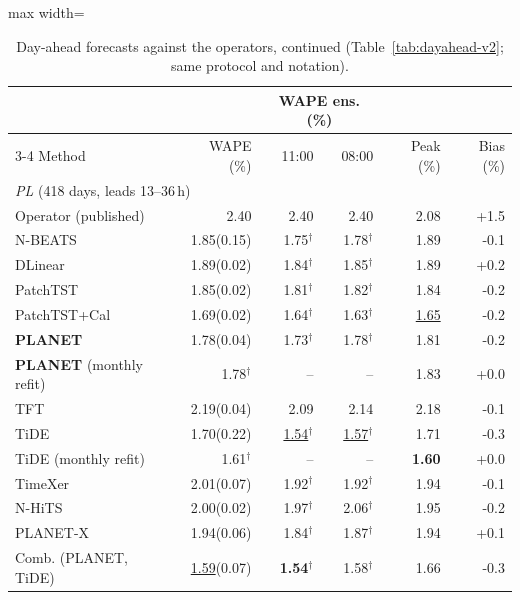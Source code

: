 \begin{table}[!t]
\centering
\caption{Day-ahead forecasts against the operators, continued (Table~\ref{tab:dayahead-v2}; same protocol and notation).}
\label{tab:dayahead-v2-c}
\setlength{\tabcolsep}{2.5pt}\footnotesize
\begin{adjustbox}{max width=\linewidth}
\begin{tabular}{lrrrrr}
\toprule
 & & \multicolumn{2}{c}{WAPE ens. (\%)} & & \\
\cmidrule(lr){3-4}
Method & WAPE (\%) & 11:00 & 08:00 & Peak (\%) & Bias (\%) \\
\midrule
\multicolumn{6}{l}{\textit{PL} (418 days, leads 13--36\,h)} \\
\quad Operator (published) & 2.40 & 2.40 & 2.40 & 2.08 & +1.5 \\
\quad N-BEATS & 1.85{\scriptsize\color{gray}(0.15)} & 1.75$^{\dagger}$ & 1.78$^{\dagger}$ & 1.89 & -0.1 \\
\quad DLinear & 1.89{\scriptsize\color{gray}(0.02)} & 1.84$^{\dagger}$ & 1.85$^{\dagger}$ & 1.89 & +0.2 \\
\quad PatchTST & 1.85{\scriptsize\color{gray}(0.02)} & 1.81$^{\dagger}$ & 1.82$^{\dagger}$ & 1.84 & -0.2 \\
\quad PatchTST+Cal & 1.69{\scriptsize\color{gray}(0.02)} & 1.64$^{\dagger}$ & 1.63$^{\dagger}$ & \underline{1.65} & -0.2 \\
\quad \textbf{PLANET} & 1.78{\scriptsize\color{gray}(0.04)} & 1.73$^{\dagger}$ & 1.78$^{\dagger}$ & 1.81 & -0.2 \\
\quad \textbf{PLANET} (monthly refit) & 1.78$^{\dagger}$ & -- & -- & 1.83 & +0.0 \\
\quad TFT & 2.19{\scriptsize\color{gray}(0.04)} & 2.09 & 2.14 & 2.18 & -0.1 \\
\quad TiDE & 1.70{\scriptsize\color{gray}(0.22)} & \underline{1.54}$^{\dagger}$ & \underline{1.57}$^{\dagger}$ & 1.71 & -0.3 \\
\quad TiDE (monthly refit) & 1.61$^{\dagger}$ & -- & -- & \textbf{1.60} & +0.0 \\
\quad TimeXer & 2.01{\scriptsize\color{gray}(0.07)} & 1.92$^{\dagger}$ & 1.92$^{\dagger}$ & 1.94 & -0.1 \\
\quad N-HiTS & 2.00{\scriptsize\color{gray}(0.02)} & 1.97$^{\dagger}$ & 2.06$^{\dagger}$ & 1.95 & -0.2 \\
\quad PLANET-X & 1.94{\scriptsize\color{gray}(0.06)} & 1.84$^{\dagger}$ & 1.87$^{\dagger}$ & 1.94 & +0.1 \\
\quad Comb. (PLANET, TiDE) & \underline{1.59}{\scriptsize\color{gray}(0.07)} & \textbf{1.54}$^{\dagger}$ & 1.58$^{\dagger}$ & 1.66 & -0.3 \\

\end{tabular}
\end{adjustbox}
\end{table}
